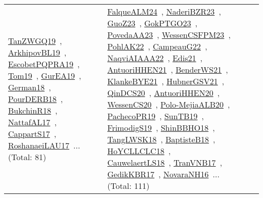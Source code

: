 {\begin{longtable}{lp{3cm}>{\raggedright\arraybackslash}p{6cm}>{\raggedright\arraybackslash}p{6cm}>{\raggedright\arraybackslash}p{8cm}}
\href{../works/TanZWGQ19.pdf}{TanZWGQ19}~\cite{TanZWGQ19}, \href{../works/ArkhipovBL19.pdf}{ArkhipovBL19}~\cite{ArkhipovBL19}, \href{../works/EscobetPQPRA19.pdf}{EscobetPQPRA19}~\cite{EscobetPQPRA19}, \href{../works/Tom19.pdf}{Tom19}~\cite{Tom19}, \href{../works/GurEA19.pdf}{GurEA19}~\cite{GurEA19}, \href{../works/German18.pdf}{German18}~\cite{German18}, \href{../works/PourDERB18.pdf}{PourDERB18}~\cite{PourDERB18}, \href{../works/BukchinR18.pdf}{BukchinR18}~\cite{BukchinR18}, \href{../works/NattafAL17.pdf}{NattafAL17}~\cite{NattafAL17}, \href{../works/CappartS17.pdf}{CappartS17}~\cite{CappartS17}, \href{../works/RoshanaeiLAU17.pdf}{RoshanaeiLAU17}~\cite{RoshanaeiLAU17}... (Total: 81) & \href{../works/FalqueALM24.pdf}{FalqueALM24}~\cite{FalqueALM24}, \href{../works/NaderiBZR23.pdf}{NaderiBZR23}~\cite{NaderiBZR23}, \href{../works/GuoZ23.pdf}{GuoZ23}~\cite{GuoZ23}, \href{../works/GokPTGO23.pdf}{GokPTGO23}~\cite{GokPTGO23}, \href{../works/PovedaAA23.pdf}{PovedaAA23}~\cite{PovedaAA23}, \href{../works/WessenCSFPM23.pdf}{WessenCSFPM23}~\cite{WessenCSFPM23}, \href{../works/PohlAK22.pdf}{PohlAK22}~\cite{PohlAK22}, \href{../works/CampeauG22.pdf}{CampeauG22}~\cite{CampeauG22}, \href{../works/NaqviAIAAA22.pdf}{NaqviAIAAA22}~\cite{NaqviAIAAA22}, \href{../works/Edis21.pdf}{Edis21}~\cite{Edis21}, \href{../works/AntuoriHHEN21.pdf}{AntuoriHHEN21}~\cite{AntuoriHHEN21}, \href{../works/BenderWS21.pdf}{BenderWS21}~\cite{BenderWS21}, \href{../works/KlankeBYE21.pdf}{KlankeBYE21}~\cite{KlankeBYE21}, \href{../works/HubnerGSV21.pdf}{HubnerGSV21}~\cite{HubnerGSV21}, \href{../works/QinDCS20.pdf}{QinDCS20}~\cite{QinDCS20}, \href{../works/AntuoriHHEN20.pdf}{AntuoriHHEN20}~\cite{AntuoriHHEN20}, \href{../works/WessenCS20.pdf}{WessenCS20}~\cite{WessenCS20}, \href{../works/Polo-MejiaALB20.pdf}{Polo-MejiaALB20}~\cite{Polo-MejiaALB20}, \href{../works/PachecoPR19.pdf}{PachecoPR19}~\cite{PachecoPR19}, \href{../works/SunTB19.pdf}{SunTB19}~\cite{SunTB19}, \href{../works/FrimodigS19.pdf}{FrimodigS19}~\cite{FrimodigS19}, \href{../works/ShinBBHO18.pdf}{ShinBBHO18}~\cite{ShinBBHO18}, \href{../works/TangLWSK18.pdf}{TangLWSK18}~\cite{TangLWSK18}, \href{../works/BaptisteB18.pdf}{BaptisteB18}~\cite{BaptisteB18}, \href{../works/HoYCLLCLC18.pdf}{HoYCLLCLC18}~\cite{HoYCLLCLC18}, \href{../works/CauwelaertLS18.pdf}{CauwelaertLS18}~\cite{CauwelaertLS18}, \href{../works/TranVNB17.pdf}{TranVNB17}~\cite{TranVNB17}, \href{../works/GedikKBR17.pdf}{GedikKBR17}~\cite{GedikKBR17}, \href{../works/NovaraNH16.pdf}{NovaraNH16}~\cite{NovaraNH16}... (Total: 111)\\

\end{longtable}}
